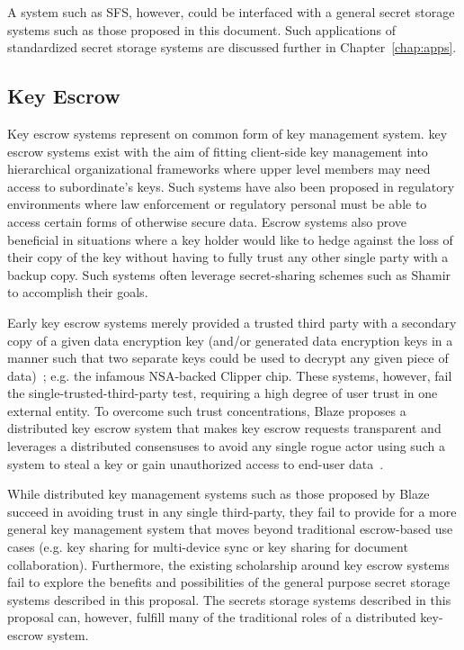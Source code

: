 A system such as SFS, however, could be interfaced with a general
secret storage systems such as those proposed in this document. Such
applications of standardized secret storage systems are discussed
further in Chapter~\ref{chap:apps}.

\subsection{Key Escrow}

Key escrow systems represent on common form of key management system.
key escrow systems exist with the aim of fitting client-side key
management into hierarchical organizational frameworks where upper
level members may need access to subordinate's keys. Such systems have
also been proposed in regulatory environments where law enforcement or
regulatory personal must be able to access certain forms of otherwise
secure data. Escrow systems also prove beneficial in situations where
a key holder would like to hedge against the loss of their copy of the
key without having to fully trust any other single party with a backup
copy. Such systems often leverage secret-sharing schemes such as
Shamir~\cite{shamir1979} to accomplish their goals.

Early key escrow systems merely provided a trusted third party with a
secondary copy of a given data encryption key (and/or generated data
encryption keys in a manner such that two separate keys could be used
to decrypt any given piece of data)~\cite{denning1996}; e.g. the
infamous NSA-backed Clipper chip. These systems, however, fail the
single-trusted-third-party test, requiring a high degree of user trust
in one external entity. To overcome such trust concentrations, Blaze
proposes a distributed key escrow system that makes key escrow
requests transparent and leverages a distributed consensuses to avoid
any single rogue actor using such a system to steal a key or gain
unauthorized access to end-user data~\cite{blaze1996}.

While distributed key management systems such as those proposed by
Blaze succeed in avoiding trust in any single third-party, they fail
to provide for a more general key management system that moves beyond
traditional escrow-based use cases (e.g. key sharing for multi-device
sync or key sharing for document collaboration). Furthermore, the
existing scholarship around key escrow systems fail to explore the
benefits and possibilities of the general purpose secret storage
systems described in this proposal. The secrets storage systems
described in this proposal can, however, fulfill many of the
traditional roles of a distributed key-escrow system.

